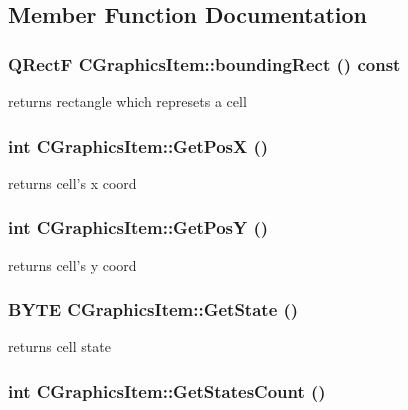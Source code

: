 \subsection{Member Function Documentation}
\hypertarget{classCGraphicsItem_abe95249eb365a95ba48f98d716081d1c}{
\subsubsection[{boundingRect}]{\setlength{\rightskip}{0pt plus 5cm}QRectF CGraphicsItem::boundingRect () const}}
\label{classCGraphicsItem_abe95249eb365a95ba48f98d716081d1c}
returns rectangle which represets a cell \hypertarget{classCGraphicsItem_a71cf5e1e005071bc98346dfd688bb5ae}{
\subsubsection[{GetPosX}]{\setlength{\rightskip}{0pt plus 5cm}int CGraphicsItem::GetPosX ()}}
\label{classCGraphicsItem_a71cf5e1e005071bc98346dfd688bb5ae}
returns cell's x coord \hypertarget{classCGraphicsItem_a0027198ae4260474a36bbbb55d55184b}{
\subsubsection[{GetPosY}]{\setlength{\rightskip}{0pt plus 5cm}int CGraphicsItem::GetPosY ()}}
\label{classCGraphicsItem_a0027198ae4260474a36bbbb55d55184b}
returns cell's y coord \hypertarget{classCGraphicsItem_afdb90d7fa1103b248678df935c323078}{
\subsubsection[{GetState}]{\setlength{\rightskip}{0pt plus 5cm}BYTE CGraphicsItem::GetState ()}}
\label{classCGraphicsItem_afdb90d7fa1103b248678df935c323078}
returns cell state \hypertarget{classCGraphicsItem_af302d0c5f3b0978e34a90b8540de2bc0}{
\subsubsection[{GetStatesCount}]{\setlength{\rightskip}{0pt plus 5cm}int CGraphicsItem::GetStatesCount ()}}
